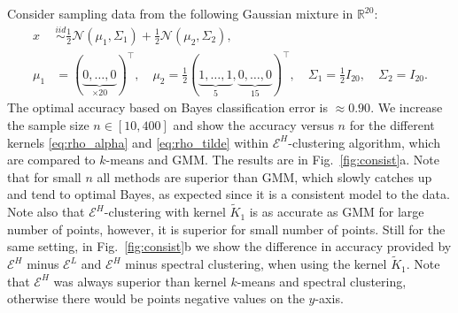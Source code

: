 \documentclass[aps,preprint,nofootinbib,floatfix]{revtex4-1}
\newcommand\kk{K}
\begin{document}
Consider sampling data from the following Gaussian mixture in 
$\mathbb{R}^{20}$:
\begin{equation}
\label{eq:20gauss}
\begin{split}
x &\stackrel{iid}{\sim} \tfrac{1}{2} \mathcal{N}(\mu_1,\Sigma_1)+
\tfrac{1}{2} \mathcal{N}(\mu_2,\Sigma_2) , \\
\mu_1 &= (\underbrace{0,\dotsc,0}_{\times 20})^\top ,\quad
\mu_2 = \tfrac{1}{2} 
(\underbrace{1,\dotsc,1}_{5},\underbrace{0,\dotsc,0}_{15})^\top, \quad
\Sigma_1 = \tfrac{1}{2} I_{20},  \quad
\Sigma_2 = I_{20}.
\end{split}
\end{equation}
The optimal accuracy based on Bayes
classification error is $\approx 0.90$. 
We increase the sample size $n \in [10,400]$ and show the accuracy versus
$n$ for the different kernels 
\eqref{eq:rho_alpha} and \eqref{eq:rho_tilde}
within $\mathcal{E}^H$-clustering
algorithm, which are compared to $k$-means and GMM. The results are
in Fig.~\ref{fig:consist}a.
Note that for small $n$ all methods
are superior than GMM, which slowly catches up and tend to optimal Bayes,
as expected since it is a consistent model to the data. 
Note also that $\mathcal{E}^H$-clustering
with kernel $\widetilde{\kk}_{1}$ is as accurate as GMM for 
large number of points, however,
it is superior for small number of points. Still for
the same setting, in Fig.~\ref{fig:consist}b we
show the difference in accuracy provided by $\mathcal{E}^H$ minus
$\mathcal{E}^L$ and $\mathcal{E}^H$ minus spectral clustering, when using the
kernel $\widetilde{\kk}_{1}$.
Note that $\mathcal{E}^H$ was
always superior than kernel $k$-means and spectral clustering,  
otherwise there would be points negative values on the $y$-axis.
\end{document}
